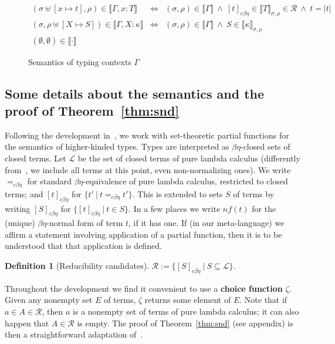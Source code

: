 \documentclass{article}
\newcommand{\choice}[0]{\zeta}
\newcommand{\interp}[1]{\llbracket #1 \rrbracket}
\newcommand{\cbe}[0]{c\beta\eta}
\newtheorem{definition}[theorem]{Definition}
\begin{document}
\begin{figure}
\[
\begin{array}{lll}
(\sigma\uplus[x\mapsto t],\rho)\in\interp{\Gamma,x:T} & \Leftrightarrow & (\sigma,\rho)\in\interp{\Gamma} \ \wedge\ 
 [t]_{\cbe}\in\interp{T}_{\sigma,\rho}\in\mathcal{R}\ \wedge\ t = |t| \\
(\sigma,\rho\uplus[X\mapsto S])\in\interp{\Gamma,X:\kappa} & \Leftrightarrow & (\sigma,\rho)\in\interp{\Gamma} \ \wedge\ 
S\in\interp{\kappa}_{\sigma,\rho} \\
(\emptyset,\emptyset)\in\interp{\cdot}
\end{array}
\]
\caption{Semantics of typing contexts $\Gamma$}
\label{fig:semctxt}
\end{figure}

\subsection{Some details about the semantics and the proof of Theorem~\ref{thm:snd}}
\label{sec:snd}

Following the development in~\cite{stump17}, we work with
set-theoretic partial functions for the semantics of higher-kinded
types.  Types are interpreted as $\beta\eta$-closed sets of closed
terms. Let $\mathcal{L}$ be the set of closed terms of pure lambda calculus
(differently from~\cite{stump17}, we include all terms at this point,
even non-normalizing ones).  We
write $=_{\cbe}$ for standard $\beta\eta$-equivalence of pure lambda calculus, restricted to
closed terms; and $[t]_{\cbe}$ for $\{ t'\ |\ t =_{\cbe} t'\}$.  This
is extended to sets $S$ of terms by writing $[S]_{\cbe}$ for
$\{[t]_{\cbe}\ |\ t\in S\}$.  In a few places we write
$\textit{nf}(t)$ for the (unique) $\beta\eta$-normal form of term $t$,
if it has one.  If (in our meta-language) we affirm a statement
involving application of a partial function, then it is to be
understood that that application is defined.

\begin{definition}[Reducibility candidates]
  $\mathcal{R} := \{ [S]_{\cbe}\ |\ S\subseteq \mathcal{L} \}$.
\end{definition}

Throughout the development we find it convenient to use a
\textbf{choice function} $\choice$.  Given any nonempty set $E$ of
terms, $\choice$ returns some element of $E$.  Note that if $a \in A
\in \mathcal{R}$, then $a$ is a nonempty set of terms of pure lambda
calculus; it can also happen that $A \in\mathcal{R}$ is empty.  The
proof of Theorem~\ref{thm:snd} (see appendix) is then a straightforward adaptation of~\cite{stump17}. 
\end{document}
